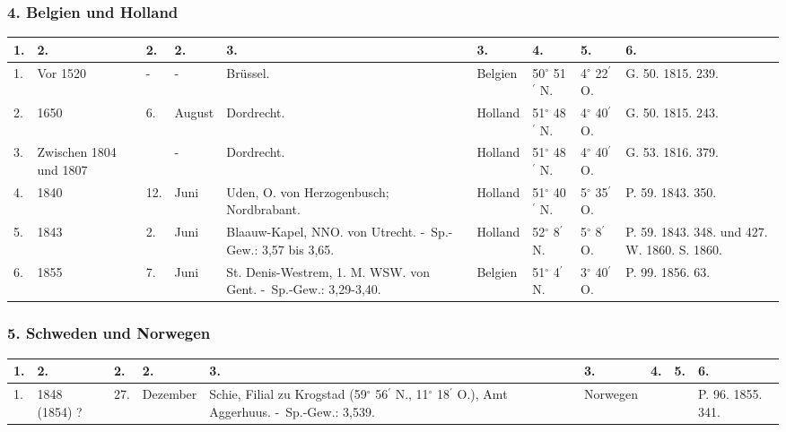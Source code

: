 \documentclass[a4paper, 8pt, oneside, polutonikogreek, german]{article}
\begin{document}
\subsubsection{4. Belgien und Holland}
\begin{table}[H]
    \centering
    \footnotesize
    \begin{tabular}{|p{3mm}|p{10mm}|p{5mm}|p{9mm}|p{25mm}|p{13mm}|p{11mm}|p{11mm}|p{18mm}|}
    \hline
        1. & 2. & 2. & 2. & 3. & 3. & 4. & 5. & 6. \\ \hline
        1. & Vor 1520 & - & - & Brüssel. & Belgien & 50$^\circ$ 51$^\prime$ N. & 4$^\circ$ 22$^\prime$ O. & G. 50. 1815. 239. \\ \hline
        2. & 1650 & 6. & August & Dordrecht. & Holland & 51$^\circ$ 48$^\prime$ N. & 4$^\circ$ 40$^\prime$ O. & G. 50. 1815. 243. \\ \hline
        3. & Zwischen 1804 und 1807 & ~ & - & Dordrecht. & Holland & 51$^\circ$ 48$^\prime$ N. & 4$^\circ$ 40$^\prime$ O. & G. 53. 1816. 379. \\ \hline
        4. & 1840 & 12. & Juni & Uden, O. von Herzogenbusch; Nordbrabant. & Holland & 51$^\circ$ 40$^\prime$ N. & 5$^\circ$ 35$^\prime$ O. & P. 59. 1843. 350. \\ \hline
        5. & 1843 & 2. & Juni & Blaauw-Kapel, NNO. von Utrecht. - Sp.-Gew.: 3,57 bis 3,65. & Holland & 52$^\circ$ 8$^\prime$ N. & 5$^\circ$ 8$^\prime$ O. & P. 59. 1843. 348. und 427. W. 1860. S. 1860. \\ \hline
        6. & 1855 & 7. & Juni & St. Denis-Westrem, 1. M. WSW. von Gent. - Sp.-Gew.: 3,29-3,40. & Belgien & 51$^\circ$ 4$^\prime$ N. & 3$^\circ$ 40$^\prime$ O. & P. 99. 1856. 63. \\ \hline
    \end{tabular}
\end{table}
\subsubsection{5. Schweden und Norwegen}
\begin{table}[H]
    \centering
    \footnotesize
    \begin{tabular}{|l|p{17mm}|l|l|p{30mm}|l|l|l|p{13mm}|}
    \hline
        1. & 2. & 2. & 2. & 3. & 3. & 4. & 5. & 6. \\ \hline
        1. & 1848 (1854) ? & 27. & Dezember & Schie, Filial zu Krogstad (59$^\circ$ 56$^\prime$ N., 11$^\circ$ 18$^\prime$ O.), Amt Aggerhuus. - Sp.-Gew.: 3,539. & Norwegen & ~ & ~ & P. 96. 1855. 341. \\ \hline
    \end{tabular}
\end{table}
\end{document}
